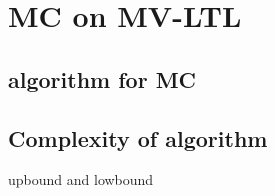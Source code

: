 \section{MC on MV-LTL }

\subsection{algorithm for MC }
\subsection{Complexity of algorithm}
 upbound and lowbound
 